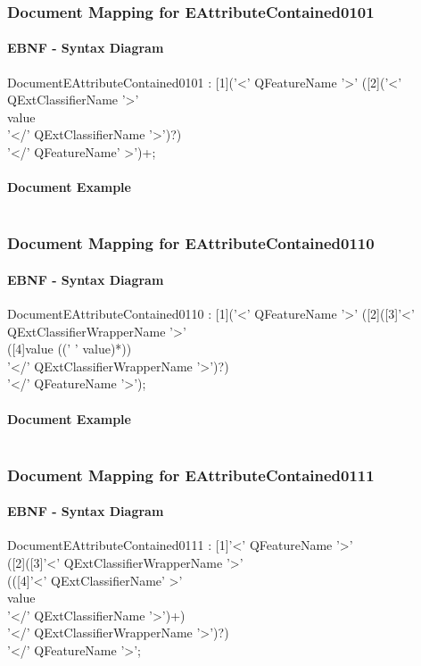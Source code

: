 \documentclass[11pt,a4paper]{article}
\begin{document}
\subsubsection{Document Mapping for EAttributeContained0101}
\paragraph{EBNF - Syntax Diagram}
\begin{rail}
DocumentEAttributeContained0101 : [1]('<' QFeatureName '>' ([2]('<' QExtClassifierName '>' \\
value \\
'</' QExtClassifierName '>')?)\\
'</' QFeatureName' >')+; 
\end{rail}

\paragraph{Document Example}
\inputminted[fontsize=\footnotesize]{xml}{examples/EAttributeContained0101.xml}

\subsubsection{Document Mapping for EAttributeContained0110}
\paragraph{EBNF - Syntax Diagram}
\begin{rail}
DocumentEAttributeContained0110 : [1]('<' QFeatureName '>'  ([2]([3]'<' QExtClassifierWrapperName '>'\\
([4]value ((' ' value)*)) \\
'</' QExtClassifierWrapperName '>')?) \\
'</' QFeatureName '>'); 
\end{rail}

\paragraph{Document Example}
\inputminted[fontsize=\footnotesize]{xml}{examples/EAttributeContained0110.xml}

\subsubsection{Document Mapping for EAttributeContained0111}
\paragraph{EBNF - Syntax Diagram}
\begin{rail}
DocumentEAttributeContained0111 : [1]'<' QFeatureName '>'  \\
([2]([3]'<' QExtClassifierWrapperName '>'\\
(([4]'<' QExtClassifierName' >' \\
value \\
'</' QExtClassifierName '>')+) \\
'</' QExtClassifierWrapperName '>')?)\\
'</' QFeatureName '>'; 
\end{rail}
\end{document}
